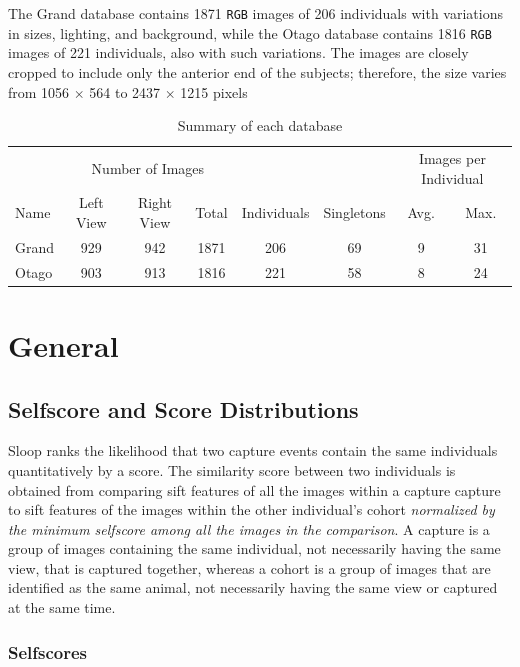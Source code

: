 The Grand database contains 1871 \texttt{RGB} images of 206 individuals with
variations in sizes, lighting, and background, while the Otago database
contains 1816 \texttt{RGB} images of 221 individuals, also with such
variations. The images are closely cropped to include only the anterior end of
the subjects; therefore, the size varies from 1056 $\times$ 564 to 2437
$\times$ 1215 pixels

\begin{table}[htb]
\captionsetup{justification=centering}
  \caption{Summary of each database}
  \label{database-table} %
  \centering
  \begin{tabular}{lccccccc}
    \toprule
    & \multicolumn{3}{c}{Number of Images} & & &
        \multicolumn{2}{c}{Images per Individual} \\
    \cmidrule{2-4}
    \cmidrule{7-8}
    Name & Left View & Right View & Total & Individuals & Singletons & Avg.
        & Max. \\
    \midrule
    Grand & 929 & 942 & 1871 & 206  & 69 & 9 & 31 \\
    Otago & 903 & 913 & 1816 & 221  & 58 & 8 & 24 \\
    \bottomrule
  \end{tabular}
\end{table}


\section{General}

\subsection{Selfscore and Score Distributions}

Sloop ranks the likelihood that two capture events contain the same individuals
quantitatively by a score. The similarity score between two individuals is
obtained from comparing sift features of all the images within a capture
capture to sift features of the images within the other individual's cohort
\emph{normalized by the minimum selfscore among all the images in the
comparison}. A capture is a group of images containing the same individual, not
necessarily having the same view, that is captured together, whereas a cohort
is a group of images that are identified as the same animal, not necessarily
having the same view or captured at the same time.

\subsubsection{Selfscores}


